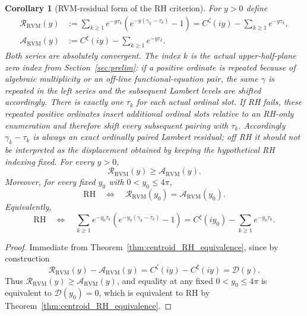 \documentclass[11pt]{amsart}
\numberwithin{equation}{section}
\newtheorem{corollary}[theorem]{Corollary}
\theoremstyle{definition}
\theoremstyle{remark}
\newcommand{\RH}{\mathrm{RH}}
\begin{document}
\begin{corollary}[RVM-residual form of the RH criterion]\label{cor:RVM_residual_RH_equivalence}
For $y>0$ define
\begin{align}
\mathcal R_{\mathrm{RVM}}(y)
&:=\sum_{k\ge1}e^{-y\tau_k}
\left(e^{-y(\gamma_k-\tau_k)}-1\right)
= C^{\zeta}(iy)-\sum_{k\ge1}e^{-y\tau_k},
\label{eq:RVM_residual_laplace}\\
\mathcal A_{\mathrm{RVM}}(y)
&:=C^{\xi}(iy)-\sum_{k\ge1}e^{-y\tau_k}.
\label{eq:RVM_arithmetic_archimedean_side}
\end{align}
Both series are absolutely convergent. The index $k$ is the actual upper-half-plane zero index from Section~\ref{sec:prelim}: if a positive ordinate is repeated because of algebraic multiplicity or an off-line functional-equation pair, the same $\gamma$ is repeated in the left series and the subsequent Lambert levels are shifted accordingly. There is exactly one $\tau_k$ for each actual ordinal slot. If RH fails, these repeated positive ordinates insert additional ordinal slots relative to an RH-only enumeration and therefore shift every subsequent pairing with $\tau_k$. Accordingly $\gamma_k-\tau_k$ is always an exact \emph{ordinally paired} Lambert residual; off RH it should not be interpreted as the displacement obtained by keeping the hypothetical RH indexing fixed. For every $y>0$,
\begin{equation}\label{eq:RVM_residual_inequality}
\boxed{\mathcal R_{\mathrm{RVM}}(y)\ge
\mathcal A_{\mathrm{RVM}}(y).}
\end{equation}
Moreover, for every fixed $y_0$ with $0<y_0\le4\pi$,
\begin{equation}\label{eq:RVM_residual_RH_equivalence}
\boxed{
\RH
\quad\Longleftrightarrow\quad
\mathcal R_{\mathrm{RVM}}(y_0)
=
\mathcal A_{\mathrm{RVM}}(y_0).}
\end{equation}
Equivalently,
\begin{equation}\label{eq:RVM_residual_RH_equivalence_expanded}
\boxed{
\RH
\quad\Longleftrightarrow\quad
\sum_{k\ge1}e^{-y_0\tau_k}
\left(e^{-y_0(\gamma_k-\tau_k)}-1\right)
=
C^{\xi}(iy_0)-\sum_{k\ge1}e^{-y_0\tau_k}.}
\end{equation}
\end{corollary}

\begin{proof}
Immediate from Theorem~\ref{thm:centroid_RH_equivalence}, since by construction
\begin{equation}\label{eq:RVM_residual_difference_is_defect}
\mathcal R_{\mathrm{RVM}}(y)-\mathcal A_{\mathrm{RVM}}(y)
=C^{\zeta}(iy)-C^{\xi}(iy)=\mathcal D(y).
\end{equation}
Thus \(\mathcal R_{\mathrm{RVM}}(y)\ge\mathcal A_{\mathrm{RVM}}(y)\), and equality at any fixed \(0<y_0\le4\pi\) is equivalent to \(\mathcal D(y_0)=0\), which is equivalent to RH by Theorem~\ref{thm:centroid_RH_equivalence}.
\end{proof}
\end{document}
